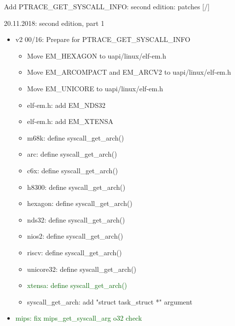 \documentclass[unicode,aspectratio=169,xcolor={table,dvipsnames,usernames}]{beamer}
\begin{document}
\begin{frame}{Add PTRACE\_GET\_SYSCALL\_INFO: second edition: patches \hfill [\insertframenumber/\inserttotalframenumber]}
\Large
\begin{block}{20.11.2018: second edition, part 1}
\begin{itemize}
	\item v2 00/16: Prepare for PTRACE\_GET\_SYSCALL\_INFO
	\begin{itemize}
		\scriptsize
		\item Move EM\_HEXAGON to uapi/linux/elf-em.h
		\item Move EM\_ARCOMPACT and EM\_ARCV2 to uapi/linux/elf-em.h
		\item Move EM\_UNICORE to uapi/linux/elf-em.h
		\item elf-em.h: add EM\_NDS32
		\item elf-em.h: add EM\_XTENSA
		\item m68k: define syscall\_get\_arch()
		\item arc: define syscall\_get\_arch()
		\item c6x: define syscall\_get\_arch()
		\item h8300: define syscall\_get\_arch()
		\item hexagon: define syscall\_get\_arch()
		\item nds32: define syscall\_get\_arch()
		\item nios2: define syscall\_get\_arch()
		\item riscv: define syscall\_get\_arch()
		\item unicore32: define syscall\_get\_arch()
		\item \textcolor{darkgreen}{xtensa: define syscall\_get\_arch()}
		\item syscall\_get\_arch: add "struct task\_struct *" argument
	\end{itemize}
	\item \textcolor{darkgreen}{mips: fix mips\_get\_syscall\_arg o32 check}
\end{itemize}
\end{block}
\end{frame}
\end{document}
